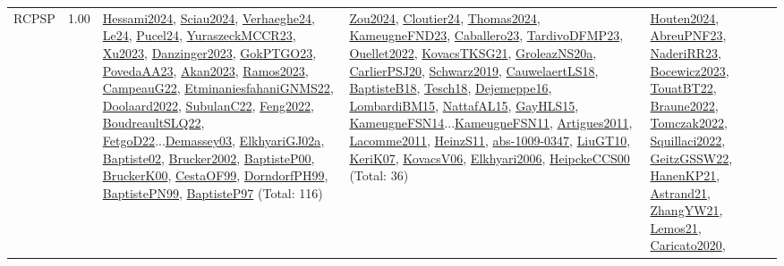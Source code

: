 {\begin{longtable}{p{3cm}r>{\raggedright\arraybackslash}p{6cm}>{\raggedright\arraybackslash}p{6cm}>{\raggedright\arraybackslash}p{8cm}}
\index{RCPSP}\index{Classification!RCPSP}RCPSP &  1.00 & \hyperref[detail:Hessami2024]{Hessami2024}, \hyperref[detail:Sciau2024]{Sciau2024}, \hyperref[detail:Verhaeghe24]{Verhaeghe24}, \hyperref[detail:Le24]{Le24}, \hyperref[detail:Pucel24]{Pucel24}, \hyperref[detail:YuraszeckMCCR23]{YuraszeckMCCR23}, \hyperref[detail:Xu2023]{Xu2023}, \hyperref[detail:Danzinger2023]{Danzinger2023}, \hyperref[detail:GokPTGO23]{GokPTGO23}, \hyperref[detail:PovedaAA23]{PovedaAA23}, \hyperref[detail:Akan2023]{Akan2023}, \hyperref[detail:Ramos2023]{Ramos2023}, \hyperref[detail:CampeauG22]{CampeauG22}, \hyperref[detail:EtminaniesfahaniGNMS22]{EtminaniesfahaniGNMS22}, \hyperref[detail:Doolaard2022]{Doolaard2022}, \hyperref[detail:SubulanC22]{SubulanC22}, \hyperref[detail:Feng2022]{Feng2022}, \hyperref[detail:BoudreaultSLQ22]{BoudreaultSLQ22}, \hyperref[detail:FetgoD22]{FetgoD22}...\hyperref[detail:Demassey03]{Demassey03}, \hyperref[detail:ElkhyariGJ02a]{ElkhyariGJ02a}, \hyperref[detail:Baptiste02]{Baptiste02}, \hyperref[detail:Brucker2002]{Brucker2002}, \hyperref[detail:BaptisteP00]{BaptisteP00}, \hyperref[detail:BruckerK00]{BruckerK00}, \hyperref[detail:CestaOF99]{CestaOF99}, \hyperref[detail:DorndorfPH99]{DorndorfPH99}, \hyperref[detail:BaptistePN99]{BaptistePN99}, \hyperref[detail:BaptisteP97]{BaptisteP97} (Total: 116) & \hyperref[detail:Zou2024]{Zou2024}, \hyperref[detail:Cloutier24]{Cloutier24}, \hyperref[detail:Thomas2024]{Thomas2024}, \hyperref[detail:KameugneFND23]{KameugneFND23}, \hyperref[detail:Caballero23]{Caballero23}, \hyperref[detail:TardivoDFMP23]{TardivoDFMP23}, \hyperref[detail:Ouellet2022]{Ouellet2022}, \hyperref[detail:KovacsTKSG21]{KovacsTKSG21}, \hyperref[detail:GroleazNS20a]{GroleazNS20a}, \hyperref[detail:CarlierPSJ20]{CarlierPSJ20}, \hyperref[detail:Schwarz2019]{Schwarz2019}, \hyperref[detail:CauwelaertLS18]{CauwelaertLS18}, \hyperref[detail:BaptisteB18]{BaptisteB18}, \hyperref[detail:Tesch18]{Tesch18}, \hyperref[detail:Dejemeppe16]{Dejemeppe16}, \hyperref[detail:LombardiBM15]{LombardiBM15}, \hyperref[detail:NattafAL15]{NattafAL15}, \hyperref[detail:GayHLS15]{GayHLS15}, \hyperref[detail:KameugneFSN14]{KameugneFSN14}...\hyperref[detail:KameugneFSN11]{KameugneFSN11}, \hyperref[detail:Artigues2011]{Artigues2011}, \hyperref[detail:Lacomme2011]{Lacomme2011}, \hyperref[detail:HeinzS11]{HeinzS11}, \hyperref[detail:abs-1009-0347]{abs-1009-0347}, \hyperref[detail:LiuGT10]{LiuGT10}, \hyperref[detail:KeriK07]{KeriK07}, \hyperref[detail:KovacsV06]{KovacsV06}, \hyperref[detail:Elkhyari2006]{Elkhyari2006}, \hyperref[detail:HeipckeCCS00]{HeipckeCCS00} (Total: 36) & \hyperref[detail:Houten2024]{Houten2024}, \hyperref[detail:AbreuPNF23]{AbreuPNF23}, \hyperref[detail:NaderiRR23]{NaderiRR23}, \hyperref[detail:Bocewicz2023]{Bocewicz2023}, \hyperref[detail:TouatBT22]{TouatBT22}, \hyperref[detail:Braune2022]{Braune2022}, \hyperref[detail:Tomczak2022]{Tomczak2022}, \hyperref[detail:Squillaci2022]{Squillaci2022}, \hyperref[detail:GeitzGSSW22]{GeitzGSSW22}, \hyperref[detail:HanenKP21]{HanenKP21}, \hyperref[detail:Astrand21]{Astrand21}, \hyperref[detail:ZhangYW21]{ZhangYW21}, \hyperref[detail:Lemos21]{Lemos21}, \hyperref[detail:Caricato2020]{Caricato2020}, 
\end{longtable}}
